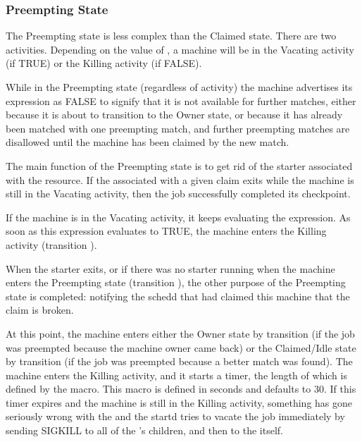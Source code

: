 \subsubsection{\label{sec:Preempting-State}Preempting State}

The Preempting state is less complex than the Claimed state.
There are two activities.
Depending on the value of , a machine will
be in the
Vacating activity (if TRUE) or the Killing activity (if FALSE).  

While in the Preempting state (regardless of activity) the machine
advertises its  expression as FALSE to signify that
it is not available for further matches, either because it is about to
transition
to the Owner state, or because it has already been matched with
one preempting match, and further preempting matches are disallowed
until the machine has been claimed by the new match.

The main function of the Preempting state is to get rid of the starter
associated with the resource.
If the  associated
with a given claim exits while the machine is still in the Vacating
activity, then the job successfully completed its checkpoint.

If the machine is in the Vacating activity, it keeps evaluating the 
 expression.
As soon as this expression evaluates to TRUE,
the machine enters the Killing activity (transition ).

When the starter exits, or if there was no starter running when the
machine enters the Preempting state (transition ),
the other purpose of the Preempting state is completed:
notifying the schedd that had claimed this machine that the claim is
broken.

At this point, the machine enters either the Owner state by
transition  (if the job was preempted because the machine
owner came back) or the Claimed/Idle state by transition 
(if the job was preempted because a better match was found).
The machine enters the Killing activity, and it starts a timer, the
length of which is defined by the 
\label{param:KillingTimeout} macro.
This macro is defined in seconds and defaults to 30.
If this timer expires and the machine is still in
the Killing activity, something has gone seriously wrong with the
 and the startd tries to vacate the job immediately by
sending SIGKILL to all of the 's children, and then to
the  itself.

